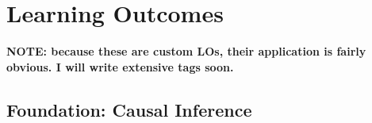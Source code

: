 \documentclass[./main.tex]{subfiles}
\begin{document}













\section{Learning Outcomes}

\textbf{NOTE: because these are custom LOs, their application is fairly obvious. I will write extensive tags soon.}

\subsection{Foundation: Causal Inference}
\end{document}
